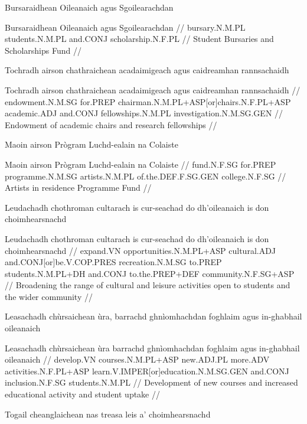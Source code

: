 \documentclass[a4paper,10pt]{article}
\begin{document}
\ex
\begingl
\glpre Bursaraidhean Oileanaich agus Sgoilearachdan 

\vspace{4mm}
\gla Bursaraidhean Oileanaich agus Sgoilearachdan  //
\glb bursary.N.M.PL students.N.M.PL and.CONJ scholarship.N.F.PL  //
\glft Student Bursaries and Scholarships Fund //
\endgl
\xe

\ex
\begingl
\glpre Tochradh airson chathraichean acadaimigeach agus caidreamhan rannsachaidh 

\vspace{4mm}
\gla Tochradh airson chathraichean acadaimigeach agus caidreamhan rannsachaidh  //
\glb endowment.N.M.SG for.PREP chairman.N.M.PL+ASP[or]chairs.N.F.PL+ASP academic.ADJ and.CONJ fellowships.N.M.PL investigation.N.M.SG.GEN  //
\glft Endowment of academic chairs and research fellowships //
\endgl
\xe

\ex
\begingl
\glpre Maoin airson Prògram Luchd-ealain na Colaiste 

\vspace{4mm}
\gla Maoin airson Prògram Luchd-ealain na Colaiste  //
\glb fund.N.F.SG for.PREP programme.N.M.SG artists.N.M.PL of.the.DEF.F.SG.GEN college.N.F.SG  //
\glft Artists in residence Programme Fund //
\endgl
\xe

\ex
\begingl
\glpre Leudachadh chothroman cultarach is cur-seachad do dh'oileanaich is don choimhearsnachd 

\vspace{4mm}
\gla Leudachadh chothroman cultarach is cur-seachad do dh'oileanaich is don choimhearsnachd  //
\glb expand.VN opportunities.N.M.PL+ASP cultural.ADJ and.CONJ[or]be.V.COP.PRES recreation.N.M.SG to.PREP students.N.M.PL+DH and.CONJ to.the.PREP+DEF community.N.F.SG+ASP  //
\glft Broadening the range of cultural and leisure activities open to students and the wider community //
\endgl
\xe

\ex
\begingl
\glpre Leasachadh chùrsaichean ùra, barrachd ghnìomhachdan foghlaim agus in-ghabhail oileanaich 

\vspace{4mm}
\gla Leasachadh chùrsaichean ùra barrachd ghnìomhachdan foghlaim agus in-ghabhail oileanaich  //
\glb develop.VN courses.N.M.PL+ASP new.ADJ.PL more.ADV activities.N.F.PL+ASP learn.V.IMPER[or]education.N.M.SG.GEN and.CONJ inclusion.N.F.SG students.N.M.PL  //
\glft Development of new courses and increased educational activity and student uptake //
\endgl
\xe

\ex
\begingl
\glpre Togail cheanglaichean nas treasa leis a' choimhearsnachd 
\end{document}
